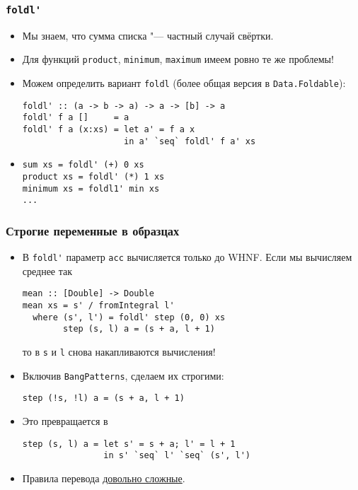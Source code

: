 \documentclass[11pt]{beamer}
\begin{document}
\begin{frame}[fragile]
\frametitle{\lstinline|foldl'|}
\begin{itemize}
    \item Мы знаем, что сумма списка "--- частный случай свёртки.
    \item Для функций \lstinline|product|, \lstinline|minimum|, \lstinline|maximum| имеем ровно те же проблемы!
    \item Можем определить вариант \lstinline|foldl| (более общая версия в \lstinline|Data.Foldable|):
\begin{lstlisting}[basicstyle=\ttfamily\small]
foldl' :: (a -> b -> a) -> a -> [b] -> a
foldl' f a []     = a
foldl' f a (x:xs) = let a' = f a x
                    in a' `seq` foldl' f a' xs
\end{lstlisting}
    \item \pause
\begin{lstlisting}
sum xs = foldl' (+) 0 xs
product xs = foldl' (*) 1 xs
minimum xs = foldl1' min xs
...
\end{lstlisting}
\end{itemize}
\end{frame}

\begin{frame}[fragile]
\frametitle{Строгие переменные в образцах}
\begin{itemize}
    \item В \lstinline|foldl'| параметр \lstinline|acc| вычисляется только до WHNF. Если мы вычисляем среднее так
\begin{lstlisting}[basicstyle=\ttfamily\footnotesize]
mean :: [Double] -> Double
mean xs = s' / fromIntegral l'
  where (s', l') = foldl' step (0, 0) xs
        step (s, l) a = (s + a, l + 1)
\end{lstlisting}
    то в \lstinline|s| и \lstinline|l| снова накапливаются вычисления!
    \pause
    \item Включив \lstinline|BangPatterns|, сделаем их строгими:
\begin{lstlisting}[escapeinside=||,basicstyle=\ttfamily\footnotesize]
step (!s, !l) a = (s + a, l + 1)
\end{lstlisting}
    \item Это превращается в 
\begin{lstlisting}[basicstyle=\ttfamily\footnotesize]
step (s, l) a = let s' = s + a; l' = l + 1
                in s' `seq` l' `seq` (s', l')
\end{lstlisting}
    \item Правила перевода \href{https://downloads.haskell.org/~ghc/8.6.3/docs/html/users_guide/glasgow_exts.html#recursive-and-polymorphic-let-bindings}{довольно сложные}.
\end{itemize}
\end{frame}
\end{document}
